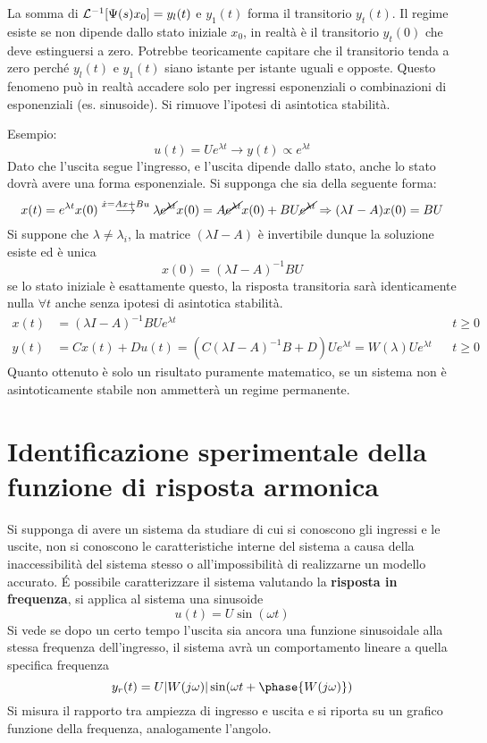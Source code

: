 La somma di $\mathcal{L}^{-1}[\Psi(s)x_0]=y_l(t)$ e $y_1(t)$ forma il transitorio
$y_t(t)$.
Il regime esiste se non dipende dallo stato iniziale $x_0$, in realtà è il
transitorio $y_t(0)$ che deve estinguersi a zero. Potrebbe teoricamente
capitare che il transitorio tenda a zero perché $y_l(t)$ e $y_1(t)$ siano
istante per istante uguali e opposte.
Questo fenomeno può in realtà accadere solo per ingressi esponenziali o
combinazioni di esponenziali (es. sinusoide).
Si rimuove l'ipotesi di asintotica stabilità.

Esempio:
$$
u(t) = Ue^{\lambda t} \longrightarrow y(t) \propto e^{\lambda t}
$$
Dato che l'uscita segue l'ingresso, e l'uscita dipende dallo stato, anche lo
stato dovrà avere una forma esponenziale. Si supponga che sia della seguente
forma:
$$
x(t) = e^{\lambda t}x(0)
\stackrel{\dot{x}=Ax+Bu}{\longrightarrow}\lambda \cancel{e^{\lambda t}}x(0) =
A\cancel{e^{\lambda t}}x(0) + BU\cancel{e^{\lambda t}} \Rightarrow (\lambda
I-A)x(0) = BU
$$
Si suppone che $\lambda \neq \lambda_i$, la matrice $(\lambda I -A)$ è
invertibile dunque la soluzione esiste ed è unica
$$
x(0) = (\lambda I -A)^{-1}BU
$$
se lo stato iniziale è esattamente questo, la risposta transitoria sarà
identicamente nulla $\forall t$ anche senza ipotesi di asintotica stabilità.
$$\begin{aligned}
x(t)  &= (\lambda I -A )^{-1}BUe^{\lambda t} &  & t\geq 0\\
y(t) &= Cx(t) +Du(t) = \left(C(\lambda I-A)^{-1}B+D\right)Ue^{\lambda t}
=W(\lambda)Ue^{\lambda t}
&  &
t\geq 0
\end{aligned}$$
Quanto ottenuto è solo un risultato puramente matematico, se un sistema non è
asintoticamente stabile non ammetterà un regime permanente.

\newpage
\section{Identificazione sperimentale della funzione di risposta armonica}
Si supponga di avere un sistema da studiare di cui si conoscono gli ingressi e
le uscite, non si conoscono le caratteristiche interne del sistema a causa
della inaccessibilità del sistema stesso o all'impossibilità di realizzarne un
modello accurato.
\'E possibile caratterizzare il sistema valutando la \textbf{risposta in
frequenza}, si applica al sistema una sinusoide
$$
u(t)  = U\sin(\omega t)
$$
Si vede se dopo un certo tempo l'uscita sia ancora una funzione sinusoidale
alla stessa frequenza dell'ingresso, il sistema avrà un comportamento lineare
a quella specifica frequenza
$$
y_r(t) = U|W(j \omega)|\sin(\omega t + \phase{W(j \omega)})
$$
Si misura il rapporto tra ampiezza di ingresso e uscita e si riporta su un
grafico funzione della frequenza, analogamente l'angolo.

